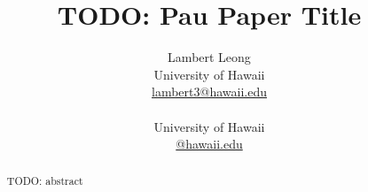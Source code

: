 \documentclass{IEEEtran}
\title{TODO: Pau Paper Title}
\author{Lambert Leong \\
  University of Hawaii \\
  {\underline{ lambert3@hawaii.edu}} \\\And
   \\
  University of Hawaii \\
  {\underline{@hawaii.edu }} \\}
\date{}
\begin{document}
\maketitle
\begin{abstract}
	TODO: abstract
\end{abstract}


%
%
%
%
%




%
\end{document}
